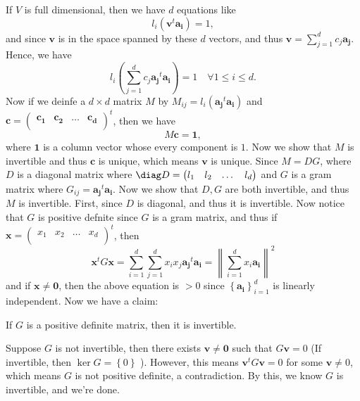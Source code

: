 \begin{note}
    If \(V\) is full dimensional, then we have \(d\) equations like 
    \[
        l_i \left( \mathbf{v} ^t \mathbf{a_i}  \right) = 1,
    \]  
    and since \(\mathbf{v} \) is in the space spanned by these \(d\) vectors, and thus \(\mathbf{v} = \sum_{j=1}^d c_j \mathbf{a_j}  \). Hence, we have 
    \[
        l_i \left( \sum_{j=1}^d c_j \mathbf{a_j}^t \mathbf{a_i}  \right) = 1 \quad \forall 1 \le i \le d. 
    \] 
    Now if we deinfe a \(d \times d\) matrix \(M\) by 
    \(M_{ij} = l_i \left( \mathbf{a_j}^t \mathbf{a_i}   \right)  \) and \(\mathbf{c}  = \begin{pmatrix}
        \mathbf{c_1}  & \mathbf{c_2}  & \dots   & \mathbf{c_d}   \\
    \end{pmatrix}^t\), then we have 
    \[
        M \mathbf{c} = \mathbf{1}, 
    \]    where \(\mathbf{1} \) is a column vector whose every component is \(1\). Now we show that \(M\) is invertible and thus \(\mathbf{c} \) is unique, which means \(\mathbf{v} \) is unique. Since \(M = DG\), where \(D\) is a diagonal matrix where \(\diag D = \begin{pmatrix}
        l_1 & l_2 & \dots  & l_d  \\
    \end{pmatrix}\) and \(G\) is a gram matrix where \(G_{ij} = \mathbf{a_j}^t \mathbf{a_i}  \). Now we show that \(D,G\) are both invertible, and thus \(M\) is invertible. First, since \(D\) is diagonal, and thus it is invertible. Now notice that \(G\) is positive defnite since \(G\) is a gram matrix, and thus if \(\mathbf{x} = \begin{pmatrix}
        x_1 & x_2 & \dots  & x_d  \\
    \end{pmatrix}^t\), then 
    \[
        \mathbf{x} ^t G \mathbf{x} = \sum_{i=1}^d \sum_{j=1}^d x_i x_j \mathbf{a_j}^t \mathbf{a_i} = \left\lVert \sum_{i=1}^d x_i \mathbf{a_i}   \right\rVert^2    
    \] and if \(\mathbf{x} \neq \mathbf{0} \), then the above equation is \(>0\) since \(\left\{ \mathbf{a_i} \right\} _{i=1}^d  \) is linearly independent. Now we have a claim:
    \begin{claim}
        If \(G\) is a positive definite matrix, then it is invertible. 
    \end{claim}  
    \begin{explanation}
        Suppose \(G\) is not invertible, then there exists \(\mathbf{v} \neq \mathbf{0} \) such that \(G \mathbf{v} = 0\) (If invertible, then \(\ker G = \left\{ 0 \right\} \) ). However, this means
        \(\mathbf{v} ^t G \mathbf{v} = 0\) for some \(\mathbf{v} \neq 0\), which means \(G\) is not positive definite, a contradiction. By this, we know \(G\) is invertible, and we're done.      
    \end{explanation}

\end{note}

